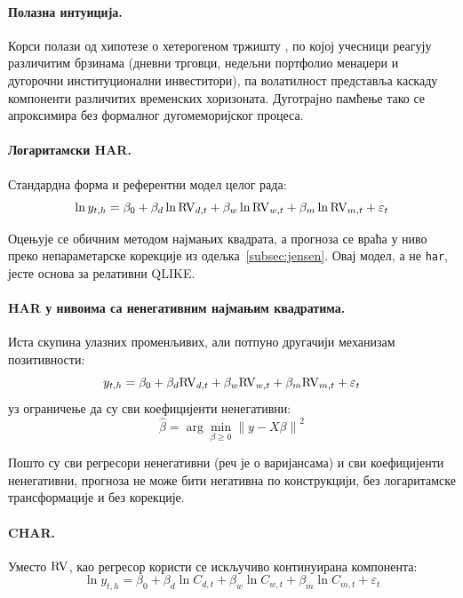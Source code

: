 \paragraph{Полазна интуиција.}
Корси \parencite{corsi2009} полази од хипотезе о хетерогеном тржишту
\parencite{muller1997}, по којој учесници реагују различитим брзинама (дневни трговци, недељни
портфолио менаџери и дугорочни институционални инвеститори), па волатилност
представља каскаду компоненти различитих временских хоризоната. Дуготрајно памћење
тако се апроксимира без формалног дугомеморијског процеса.

\paragraph{Логаритамски HAR.}
Стандардна форма и референтни модел целог рада:
\nopagebreak
\begin{equation}
\ln y_{t,h} = \beta_0 + \beta_d \ln\mathrm{RV}_{d,t} + \beta_w \ln\mathrm{RV}_{w,t} + \beta_m \ln\mathrm{RV}_{m,t} + \varepsilon_t
\label{eq:loghar}
\end{equation}

Оцењује се обичним методом најмањих квадрата, а прогноза се враћа у ниво преко
непараметарске корекције из одељка~\ref{subsec:jensen}. Овај модел, а не
\texttt{har}, јесте основа за релативни QLIKE.

\paragraph{HAR у нивоима са ненегативним најмањим квадратима.}
Иста скупина улазних променљивих, али потпуно другачији механизам позитивности:
\begin{equation}
y_{t,h} = \beta_0 + \beta_d \mathrm{RV}_{d,t} + \beta_w \mathrm{RV}_{w,t} + \beta_m \mathrm{RV}_{m,t} + \varepsilon_t
\end{equation}
уз ограничење да су сви коефицијенти ненегативни:
\begin{equation}
\hat{\beta} = \arg\min_{\beta \ge 0}\left\|y - X\beta\right\|^{2}
\end{equation}

Пошто су сви регресори ненегативни (реч је о варијансама) и сви коефицијенти
ненегативни, прогноза не може бити негативна по конструкцији, без логаритамске
трансформације и без корекције.

\paragraph{CHAR.}
Уместо $\mathrm{RV}$, као регресор користи се искључиво континуирана компонента:
\begin{equation}
\ln y_{t,h} = \beta_0 + \beta_d \ln C_{d,t} + \beta_w \ln C_{w,t} + \beta_m \ln C_{m,t} + \varepsilon_t
\end{equation}


